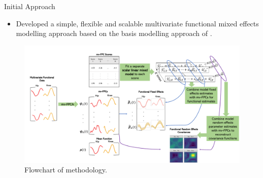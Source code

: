 \documentclass[aspectratio=128,xcolor=dvipsnames, notes]{beamer}
\newcommand{\1}{\mathbf{1}}
\begin{document}
\begin{frame}{Initial Approach \parencite{gunning_analyzing_2023}}
\begin{itemize}
    \pause \item Developed a simple, flexible and scalable multivariate functional mixed effects modelling approach based on the basis modelling approach of \textcite{morris_wavelet-based_2006}.
\end{itemize}
\begin{figure}
    \centering
    \includegraphics[width=0.75\linewidth]{figures/flowchart.pdf}
    \caption{Flowchart of methodology.}
    \label{fig:enter-label}
\end{figure}
\end{frame}
\end{document}
